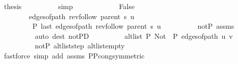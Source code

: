\begin{isabellebody}
\ {\isacharquery}{\kern0pt}thesis\isanewline
\ \ \ \ \ \ \ \ \isamarkupfalse%
\ simp\isanewline
\ \ \ \ \isamarkupfalse%
\isanewline
\ \ \ \ \ \ \isamarkupfalse%
\ False\isanewline
\ \ \ \ \ \ \isamarkupfalse%
\isanewline
\ \ \ \ \ \ \ \ {\isachardoublequoteopen}edges{\isacharunderscore}{\kern0pt}of{\isacharunderscore}{\kern0pt}path\ {\isacharparenleft}{\kern0pt}rev{\isacharunderscore}{\kern0pt}follow\ {\isacharparenleft}{\kern0pt}parent\ s{\isacharparenright}{\kern0pt}\ u{\isacharparenright}{\kern0pt}\ {\isasymnoteq}\ {\isacharbrackleft}{\kern0pt}{\isacharbrackright}{\kern0pt}{\isachardoublequoteclose}\isanewline
\ \ \ \ \ \ \ \ {\isachardoublequoteopen}{\isasymnot}\ P{\isacharprime}{\kern0pt}{\isacharprime}{\kern0pt}\ {\isacharparenleft}{\kern0pt}last\ {\isacharparenleft}{\kern0pt}edges{\isacharunderscore}{\kern0pt}of{\isacharunderscore}{\kern0pt}path\ {\isacharparenleft}{\kern0pt}rev{\isacharunderscore}{\kern0pt}follow\ {\isacharparenleft}{\kern0pt}parent\ s{\isacharparenright}{\kern0pt}\ u{\isacharparenright}{\kern0pt}{\isacharparenright}{\kern0pt}{\isacharparenright}{\kern0pt}{\isachardoublequoteclose}\isanewline
\ \ \ \ \ \ \ \ \isamarkupfalse%
\ not{\isacharunderscore}{\kern0pt}P{\isacharprime}{\kern0pt}\ assms{\isacharparenleft}{\kern0pt}{}{\isacharparenright}{\kern0pt}\isanewline
\ \ \ \ \ \ \ \ \isamarkupfalse%
\ {\isacharparenleft}{\kern0pt}auto\ dest{\isacharcolon}{\kern0pt}\ not{\isacharunderscore}{\kern0pt}P{\isacharprime}{\kern0pt}D{\isacharparenright}{\kern0pt}\isanewline
\ \ \ \ \ \ \isamarkupfalse%
\ \isamarkupfalse%
\ {\isachardoublequoteopen}alt{\isacharunderscore}{\kern0pt}list\ P{\isacharprime}{\kern0pt}{\isacharprime}{\kern0pt}\ {\isacharparenleft}{\kern0pt}Not\ {\isasymcirc}\ P{\isacharprime}{\kern0pt}{\isacharprime}{\kern0pt}{\isacharparenright}{\kern0pt}\ {\isacharparenleft}{\kern0pt}edges{\isacharunderscore}{\kern0pt}of{\isacharunderscore}{\kern0pt}path\ {\isacharbrackleft}{\kern0pt}u{\isacharcomma}{\kern0pt}\ v{\isacharbrackright}{\kern0pt}{\isacharparenright}{\kern0pt}{\isachardoublequoteclose}\isanewline
\ \ \ \ \ \ \ \ \isamarkupfalse%
\ not{\isacharunderscore}{\kern0pt}P{\isacharprime}{\kern0pt}\ alt{\isacharunderscore}{\kern0pt}list{\isacharunderscore}{\kern0pt}step\ alt{\isacharunderscore}{\kern0pt}list{\isacharunderscore}{\kern0pt}empty\isanewline
\ \ \ \ \ \ \ \ \isamarkupfalse%
\ {\isacharparenleft}{\kern0pt}fastforce\ simp\ add{\isacharcolon}{\kern0pt}\ assms{\isacharparenleft}{\kern0pt}{}{\isacharparenright}{\kern0pt}\ P{\isacharunderscore}{\kern0pt}P{\isacharprime}{\kern0pt}{\isacharprime}{\kern0pt}{\isacharunderscore}{\kern0pt}cong{\isacharbrackleft}{\kern0pt}symmetric{\isacharbrackright}{\kern0pt}{\isacharparenright}{\kern0pt}\isanewline

\end{isabellebody}
